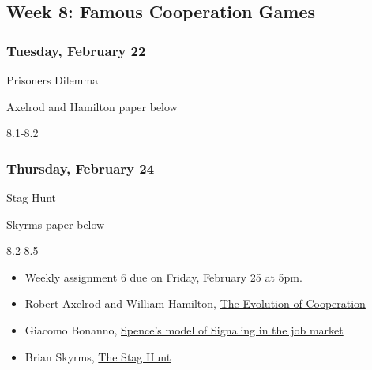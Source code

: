 \documentclass[
]{article}
\providecommand{\tightlist}{%
  \setlength{\itemsep}{0pt}\setlength{\parskip}{0pt}}
\begin{document}
\hypertarget{week-8-famous-cooperation-games}{%
\subsection{Week 8: Famous Cooperation
Games}\label{week-8-famous-cooperation-games}}

\begin{multicols}{2}

\hypertarget{tuesday-february-22}{%
\subsubsection{Tuesday, February 22}\label{tuesday-february-22}}

\begin{description}
\tightlist
\item[Topic]
Prisoners Dilemma
\item[Reading]
Axelrod and Hamilton paper below
\item[Video lectures]
8.1-8.2
\end{description}

\hypertarget{thursday-february-24}{%
\subsubsection{Thursday, February 24}\label{thursday-february-24}}

\begin{description}
\tightlist
\item[Topic]
Stag Hunt
\item[Reading]
Skyrms paper below
\item[Video lectures]
8.2-8.5
\end{description}

\end{multicols}

\begin{itemize}
\tightlist
\item
  Weekly assignment 6 due on Friday, February 25 at 5pm.
\item
  Robert Axelrod and William Hamilton,
  \href{http://www-personal.umich.edu/~axe/research/Axelrod\%20and\%20Hamilton\%20EC\%201981.pdf}{The
  Evolution of Cooperation}
\item
  Giacomo Bonanno,
  \href{http://faculty.econ.ucdavis.edu/faculty/bonanno/teaching/200C/Signaling.pdf}{Spence's
  model of Signaling in the job market}
\item
  Brian Skyrms, \href{https://www.jstor.org/stable/3218711}{The Stag
  Hunt}
\end{itemize}
\end{document}
